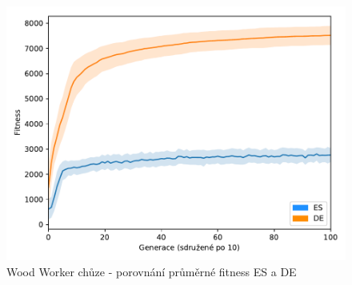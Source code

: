 		\begin{figure}[t]\centering
		\includegraphics[width=\columnwidth]{../img/WoodMap/DEvsES/WorkerWalkMem}
		\caption{Wood Worker chůze - porovnání průměrné fitness ES a DE}
		\label{obr04:WWalkESvsDE}
	\end{figure}
	\clearpage 
	
	
	
